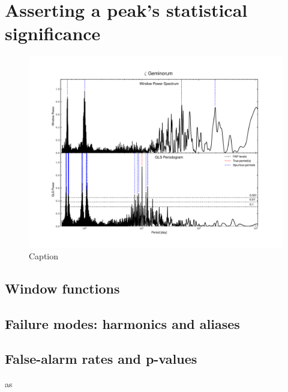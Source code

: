     \section{Asserting a peak's statistical significance}

        \begin{figure}[H]
        \centering
        \includegraphics[width=\textwidth]{report/images/chap3_methods/windows_examples.pdf}
        \caption{Caption}
        \label{3.4a}
        \end{figure}
    \subsection{Window functions}
    \subsection{Failure modes: harmonics and aliases}
    \subsection{False-alarm rates and p-values}
as